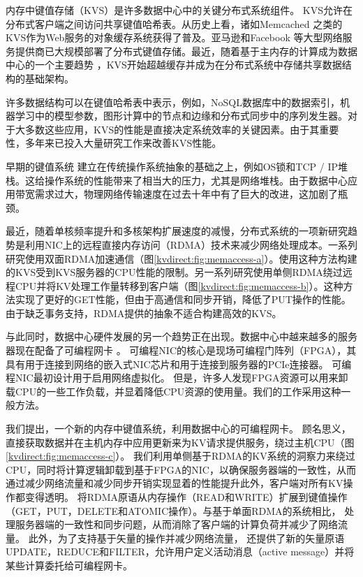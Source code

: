 内存中键值存储（KVS）是许多数据中心中的关键分布式系统组件。 KVS允许在分布式客户端之间访问共享键值哈希表。从历史上看，诸如Memcached \cite {fitzpatrick2004distributed}之类的KVS作为Web服务的对象缓存系统获得了普及。亚马逊\cite {decandia2007dynamo}和Facebook \cite {atikoglu2012workload,nishtala2013scaling}等大型网络服务提供商已大规模部署了分布式键值存储。最近，随着基于主内存的计算成为数据中心的一个主要趋势 \cite{ousterhout2010case,dragojevic2014farm}，KVS开始超越缓存并成为在分布式系统中存储共享数据结构的基础架构。

许多数据结构可以在键值哈希表中表示，例如，NoSQL数据库中的数据索引\cite {chang2008bigtable}，机器学习中的模型参数\cite {li2014scaling}，图形计算中的节点和边缘\cite {shao2013trinity,xiao17tux2}和分布式同步中的序列发生器\cite {kalia2016design}。对于大多数这些应用，KVS的性能是直接决定系统效率的关键因素。由于其重要性，多年来已投入大量研究工作来改善KVS性能。

早期的键值系统\cite {decandia2007dynamo,fitzpatrick2004distributed,nishtala2013scaling} 建立在传统操作系统抽象的基础之上，例如OS锁和TCP / IP堆栈。这给操作系统的性能带来了相当大的压力，尤其是网络堆栈。由于数据中心应用带宽需求过大，物理网络传输速度在过去十年中有了巨大的改进，这加剧了瓶颈。

最近，随着单核频率提升和多核架构扩展速度的减慢，分布式系统的一项新研究趋势是利用NIC上的远程直接内存访问（RDMA）技术来减少网络处理成本。一系列研究\cite {kalia2014using,kalia2016design}使用双面RDMA加速通信（图\ref {kvdirect:fig:memaccess-a}）。使用这种方法构建的KVS受到KVS服务器的CPU性能的限制。另一系列研究使用单侧RDMA绕过远程CPU并将KV处理工作量转移到客户端\cite {dragojevic2014farm,mitchell2013using}（图\ref {kvdirect:fig:memaccess-b}）。这种方法实现了更好的GET性能，但由于高通信和同步开销，降低了PUT操作的性能。由于缺乏事务支持，RDMA提供的抽象不适合构建高效的KVS。

与此同时，数据中心硬件发展的另一个趋势正在出现。数据中心中越来越多的服务器现在配备了可编程网卡 \cite{caulfield2016cloud,greenberg2015sdn,putnam2014reconfigurable}。
可编程NIC的核心是现场可编程门阵列（FPGA），其具有用于连接到网络的嵌入式NIC芯片和用于连接到服务器的PCIe连接器。
可编程NIC最初设计用于启用网络虚拟化\cite {vfp,li2016clicknp}。
但是，许多人发现FPGA资源可以用来卸载CPU的一些工作负载，并显着降低CPU资源的使用量\cite {ouyang14hotchips,MaZC17fpga,huang16socc,cong16dac}。我们的工作采用这种一般方法。

我们提出\oursys{}，一个新的内存中键值系统，利用数据中心的可编程网卡。
顾名思义，\oursys{} 直接获取数据并在主机内存中应用更新来为KV请求提供服务，绕过主机CPU（图 \ref {kvdirect:fig:memaccess-c}）。
我们利用单侧基于RDMA的KV系统的洞察力来绕过CPU，同时将计算逻辑卸载到基于FPGA的NIC，以确保服务器端的一致性，从而通过减少网络流量和减少同步开销实现显着的性能提升此外，客户端对所有KV操作都变得透明。
\oursys{} 将RDMA原语从内存操作（READ和WRITE）扩展到键值操作（GET，PUT，DELETE和ATOMIC操作）。与基于单面RDMA的系统相比，\oursys{} 处理服务器端的一致性和同步问题，从而消除了客户端的计算负荷并减少了网络流量。
此外，为了支持基于矢量的操作并减少网络流量，\oursys{} 还提供了新的矢量原语UPDATE，REDUCE和FILTER，允许用户定义活动消息（active message）\cite {eicken1992active}并将某些计算委托给可编程网卡。

